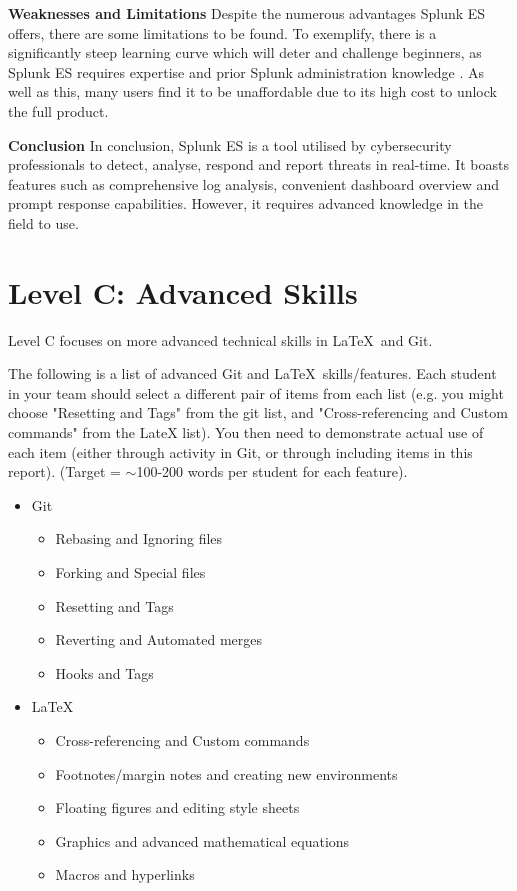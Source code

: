 \documentclass[a4paper, 11pt]{report}
\begin{document}
\textbf{Weaknesses and Limitations}
\newline Despite the numerous advantages Splunk ES offers, there are some limitations to be found. To exemplify, there is a significantly steep learning curve which will deter and challenge beginners, as Splunk ES requires expertise and prior Splunk administration knowledge \cite{trustradius}.  As well as this, many users find it to be unaffordable due to its high cost to unlock the full product.


\textbf{Conclusion}
\newline In conclusion, Splunk ES is a tool utilised by cybersecurity professionals to detect, analyse,  respond and report threats in real-time. It boasts features such as comprehensive log analysis, convenient dashboard overview and prompt response capabilities. However, it requires advanced knowledge in the field to use.




\newpage
\section{Level C: Advanced Skills}

Level C focuses on more advanced technical skills in \LaTeX\ and Git.

The following is a list of advanced Git and \LaTeX\ skills/features. Each student in your team should select a different pair of items from each list (e.g. you might choose "Resetting and Tags" from the git list, and "Cross-referencing and Custom commands" from the LateX list). You then need to demonstrate actual use of each item (either through activity in Git, or through including items in this report). (Target = $\sim$100-200 words per student for each feature).
\begin{itemize}
	\item Git
	\begin{itemize}
		\item Rebasing and Ignoring files
		\item Forking and Special files
		\item Resetting and Tags
		\item Reverting and Automated merges
		\item Hooks and Tags
	\end{itemize}
	\item \LaTeX\ 
	\begin{itemize}
		\item Cross-referencing and Custom commands
		\item Footnotes/margin notes and creating new environments
		\item Floating figures and editing style sheets
		\item Graphics and advanced mathematical equations
		\item Macros and hyperlinks
	\end{itemize}
\end{itemize}
\end{document}

